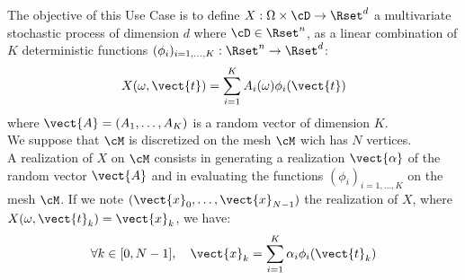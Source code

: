 \renewcommand{\filename}{docUC_StocProc_FunctionalBasisProcess.tex}
\renewcommand{\filetitle}{UC : Creation of a Functional Basis Process}

\HeaderIIILevel

\label{UCprocess}




The objective of this Use Case is to define $X: \Omega \times \cD \rightarrow \Rset^d$  a multivariate stochastic process of dimension $d$ where $\cD \in \Rset^n$, as a linear combination of $K$ deterministic functions $(\phi_i)_{i=1,\dots,K}: \Rset^n \rightarrow \Rset^d$:
\begin{align*}
  X(\omega,\vect{t})=\sum_{i=1}^KA_i(\omega)\phi_i(\vect{t})
\end{align*}
where $\vect{A}=(A_1,\dots, A_K)$ is a random vector of dimension $K$.\\

We suppose that $\cM$ is discretized on the mesh $\cM$ wich has $N$ vertices.\\
A realization of $X$ on $\cM$ consists in generating a realization $\vect{\alpha}$ of the random vector $\vect{A}$ and in evaluating the functions  $(\phi_i)_{i=1,\dots,K}$  on the mesh $\cM$. If we note $(\vect{x}_0, \dots, \vect{x}_{N-1})$ the realization of $X$, where $X(\omega, \vect{t}_k) = \vect{x}_k$, we have:
\begin{align*}
  \forall k \in [0, N-1], \quad \vect{x}_k = \sum_{i=1}^K\alpha_i\phi_i(\vect{t}_k)
\end{align*}



